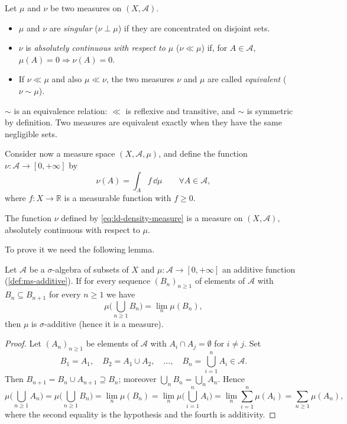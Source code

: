 \begin{definition}\label{def:ld-ac}
Let $\mu$ and $\nu$ be two measures on $(X,\mathcal A)$.
\begin{itemize}
  \item $\mu$ and $\nu$ are \emph{singular} ($\nu\perp\mu$) if they are concentrated on disjoint
    sets.
  \item $\nu$ is \emph{absolutely continuous with respect to $\mu$} ($\nu\ll\mu$) if, for
    $A\in\mathcal A$, $\mu(A)=0\Rightarrow\nu(A)=0$.
  \item If $\nu\ll\mu$ and also $\mu\ll\nu$, the two measures $\nu$ and $\mu$ are called
    \emph{equivalent} ($\nu\sim\mu$).
\end{itemize}
\end{definition}

$\sim$ is an equivalence relation: $\ll$ is reflexive and transitive, and $\sim$ is
symmetric by definition. Two measures are equivalent exactly when they have the same
negligible sets.

Consider now a measure space $(X,\mathcal A,\mu)$, and define the function
$\nu:\mathcal A\to[0,+\infty]$ by
\begin{equation}\label{eq:ld-density-measure}
  \nu(A)=\int_Af\,\dd\mu\qquad\forall A\in\mathcal A,
\end{equation}
where $f:X\to\mathbb R$ is a measurable function with $f\ge0$.

\begin{proposition}\label{prop:ld-density-measure}
The function $\nu$ defined by \eqref{eq:ld-density-measure} is a measure on $(X,\mathcal A)$,
absolutely continuous with respect to $\mu$.
\end{proposition}

To prove it we need the following lemma.

\begin{lemma}\label{lem:ld-continuity-sigma}
Let $\mathcal A$ be a $\sigma$-algebra of subsets of $X$ and $\mu:\mathcal A\to[0,+\infty]$ an
additive function (\cref{def:ms-additive}). If for every sequence $(B_n)_{n\ge1}$ of elements of
$\mathcal A$ with $B_n\subseteq B_{n+1}$ for every $n\ge1$ we have
\[
  \mu\Big(\bigcup_{n\ge1}B_n\Big)=\lim_n\mu(B_n),
\]
then $\mu$ is $\sigma$-additive (hence it is a measure).
\end{lemma}

\begin{proof}
Let $(A_n)_{n\ge1}$ be elements of $\mathcal A$ with $A_i\cap A_j=\emptyset$ for $i\ne j$. Set
\[
  B_1=A_1,\quad B_2=A_1\cup A_2,\quad\dots,\quad B_n=\bigcup_{i=1}^nA_i\in\mathcal A .
\]
Then $B_{n+1}=B_n\cup A_{n+1}\supseteq B_n$; moreover $\bigcup_nB_n=\bigcup_nA_n$. Hence
\[
  \mu\Big(\bigcup_{n\ge1}A_n\Big)=\mu\Big(\bigcup_{n\ge1}B_n\Big)=\lim_n\mu(B_n)
  =\lim_n\mu\Big(\bigcup_{i=1}^nA_i\Big)=\lim_n\sum_{i=1}^n\mu(A_i)=\sum_{n\ge1}\mu(A_n),
\]
where the second equality is the hypothesis and the fourth is additivity.
\end{proof}

